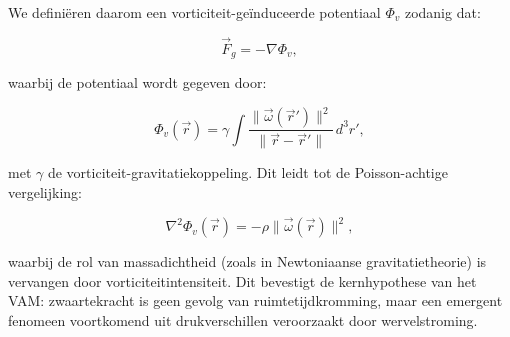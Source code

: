 We definiëren daarom een vorticiteit-geïnduceerde potentiaal $\Phi_v$ zodanig dat:

\begin{equation}
\vec{F}_g = -\nabla \Phi_v,
\end{equation}

waarbij de potentiaal wordt gegeven door:

\begin{equation}
\Phi_v(\vec{r}) = \gamma \int \frac{\|\vec{\omega}(\vec{r}')\|^2}{\|\vec{r} - \vec{r}'\|} \, d^3r',
\end{equation}

met $\gamma$ de vorticiteit-gravitatiekoppeling. Dit leidt tot de Poisson-achtige vergelijking:

\begin{equation}
\nabla^2 \Phi_v(\vec{r}) = -\rho \|\vec{\omega}(\vec{r})\|^2,
\end{equation}

waarbij de rol van massadichtheid (zoals in Newtoniaanse gravitatietheorie) is vervangen door vorticiteitintensiteit. Dit bevestigt de kernhypothese van het VAM: zwaartekracht is geen gevolg van ruimtetijdkromming, maar een emergent fenomeen voortkomend uit drukverschillen veroorzaakt door wervelstroming.
